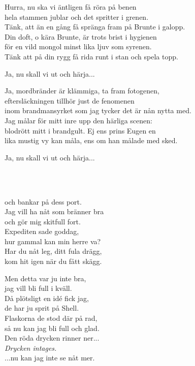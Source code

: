 Hurra, nu ska vi äntligen få röra på benen\\
hela stammen jublar och det spritter i grenen.\\
Tänk, att än en gång få spränga fram på Brunte i galopp.\\
Din doft, o kära Brunte, är trots brist i hygienen\\
för en vild mongol minst lika ljuv som syrenen.\\
Tänk att på din rygg få rida runt i stan och spela topp.

Ja, nu skall vi ut och härja...

Ja, mordbränder är klämmiga, ta fram fotogenen,\\
eftersläckningen tillhör just de fenomenen\\
inom brandmansyrket som jag tycker det är nån nytta med.\\
Jag målar för mitt inre upp den härliga scenen:\\
blodrött mitt i brandgult. Ej ens prins Eugen en\\
lika mustig vy kan måla, ens om han målade med sked. 

Ja, nu skall vi ut och härja...


\newpage 

 \\       

\\
och bankar på dess port.\\
Jag vill ha nåt som bränner bra\\
och gör mig skitfull fort.\\
Expediten sade goddag,\\
hur gammal kan min herre va?\\
Har du nåt leg, ditt fula drägg,\\
kom hit igen när du fått skägg.

Men detta var ju inte bra,\\
jag vill bli full i kväll.\\
Då plötsligt en idé fick jag,\\
de har ju sprit på Shell.\\
Flaskorna de stod där på rad,\\
så nu kan jag bli full och glad. \\
Den röda drycken rinner ner...\\
\textit{Drycken intages.}\\
...nu kan jag inte se nåt mer.

